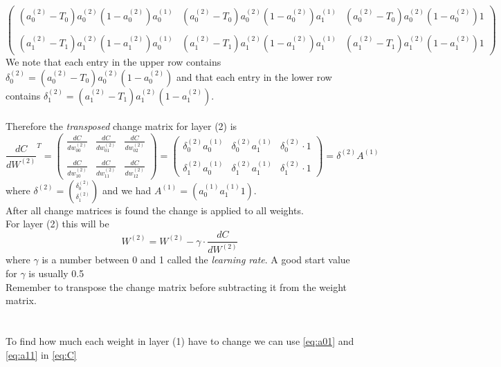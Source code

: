 \documentclass{article}
\begin{document}
$$\begin{pmatrix}
(a_0^{(2)}-T_0)a_0^{(2)}(1-a_0^{(2)})a_0^{(1)} & (a_0^{(2)}-T_0)a_0^{(2)}(1-a_0^{(2)})a_1^{(1)} & (a_0^{(2)}-T_0)a_0^{(2)}(1-a_0^{(2)})1
\\\\
(a_1^{(2)}-T_1)a_1^{(2)}(1-a_1^{(2)})a_0^{(1)} & (a_1^{(2)}-T_1)a_1^{(2)}(1-a_1^{(2)})a_1^{(1)} & (a_1^{(2)}-T_1)a_1^{(2)}(1-a_1^{(2)})1
\end{pmatrix}$$
We note that each entry in the upper row contains $\delta_0^{(2)} = (a_0^{(2)}-T_0)a_0^{(2)}(1-a_0^{(2)})$ and that each entry in the lower row contains $\delta_1^{(2)} = (a_1^{(2)}-T_1)a_1^{(2)}(1-a_1^{(2)})$.
\\
\\
Therefore the \textit{transposed} change matrix for layer (2) is $${\frac{dC}{dW^{(2)}}}^T = 
\begin{pmatrix}
\frac{dC}{dw_{00}^{(2)}} & \frac{dC}{dw_{01}^{(2)}} & \frac{dC}{dw_{02}^{(2)}}
\\\\
\frac{dC}{dw_{10}^{(2)}} & \frac{dC}{dw_{11}^{(2)}} & \frac{dC}{dw_{12}^{(2)}} 
\end{pmatrix} = \begin{pmatrix}
\delta_0^{(2)}a_0^{(1)} & \delta_0^{(2)}a_1^{(1)} & \delta_0^{(2)} \cdot 1
\\\\
\delta_1^{(2)}a_0^{(1)} & \delta_1^{(2)}a_1^{(1)} & \delta_1^{(2)} \cdot 1
\end{pmatrix} = \delta^{(2)}A^{(1)}
$$
where $\delta^{(2)} = \binom{\delta_0^{(2)}}{\delta_1^{(2)}}$
and we had $A^{(1)} = (a_0^{(1)} a_1^{(1)} 1)$.
\\
After all change matrices is found the change is applied to all weights.
\\
For layer (2) this will be $$W^{(2)} = W^{(2)} - \gamma \cdot \frac{dC}{dW^{(2)}}$$
where $\gamma$ is a number between 0 and 1 called the \textit{learning rate}. A good start value for $\gamma$ is usually 0.5
\\
Remember to transpose the change matrix before subtracting it from the weight matrix.
\\
\\
\\
To find how much each weight in layer (1) have to change we can use \eqref{eq:a01} and \eqref{eq:a11} in \eqref{eq:C}
\end{document}
